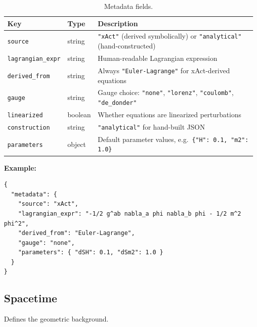 \begin{table}[htbp]
\centering
\caption{Metadata fields.}
\label{tab:json-metadata}
\begin{tabular}{@{}lll@{}}
\toprule
Key & Type & Description \\
\midrule
\texttt{source}          & string  & \texttt{"xAct"} (derived symbolically) or \texttt{"analytical"} (hand-constructed) \\
\texttt{lagrangian\_expr} & string  & Human-readable Lagrangian expression \\
\texttt{derived\_from}    & string  & Always \texttt{"Euler-Lagrange"} for xAct-derived equations \\
\texttt{gauge}           & string  & Gauge choice: \texttt{"none"}, \texttt{"lorenz"}, \texttt{"coulomb"}, \texttt{"de\_donder"} \\
\texttt{linearized}      & boolean & Whether equations are linearized perturbations \\
\texttt{construction}    & string  & \texttt{"analytical"} for hand-built JSON \\
\texttt{parameters}      & object  & Default parameter values, e.g.\ \texttt{\{"H": 0.1, "m2": 1.0\}} \\
\bottomrule
\end{tabular}
\end{table}

\textbf{Example:}

\begin{lstlisting}[style=json]
{
  "metadata": {
    "source": "xAct",
    "lagrangian_expr": "-1/2 g^ab nabla_a phi nabla_b phi - 1/2 m^2 phi^2",
    "derived_from": "Euler-Lagrange",
    "gauge": "none",
    "parameters": { "dSH": 0.1, "dSm2": 1.0 }
  }
}
\end{lstlisting}


\subsection{Spacetime}
\label{sec:json-spacetime}

Defines the geometric background.

